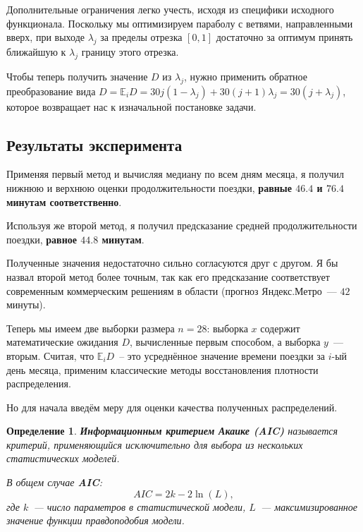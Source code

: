 \documentclass[12pt, fleqn, titlepage]{article}
\newtheorem{Def}{Определение}
\begin{document}
    Дополнительные ограничения легко учесть, исходя из специфики исходного функционала. 
    Поскольку мы оптимизируем параболу с ветвями, направленными вверх, при выходе $\lambda_j$ за пределы отрезка 
    $[0, 1]$ достаточно за оптимум принять ближайшую к $\lambda_j$ границу этого отрезка.
    
    Чтобы теперь получить значение $D$ из $\lambda_j$, нужно применить обратное преобразование 
    вида $D = \mathbb{E}_i D = 30j(1 - \lambda_j)+ 30(j + 1)\lambda_j = 30(j + \lambda_j)$, которое возвращает нас к изначальной постановке задачи.

    \subsection{Результаты эксперимента}

    Применяя первый метод и вычисляя медиану по всем дням месяца, я получил нижнюю и верхнюю оценки 
    продолжительности поездки, {\bf равные $46.4$ и $76.4$ минутам соответственно}.

    Используя же второй метод, я получил предсказание средней продолжительности поездки, {\bf равное $44.8$ минутам}.
    
    Полученные значения недостаточно сильно согласуются друг с другом. Я бы назвал второй метод более 
    точным, так как его предсказание соответствует современным коммерческим решениям в области (прогноз Яндекс.Метро~--- $42$ минуты).
    
    Теперь мы имеем две выборки размера $n=28$: выборка $x$ содержит математические ожидания $D$, вычисленные первым способом, а выборка 
    $y$~--- вторым. Считая, что $\mathbb{E}_i D$~-- это усреднённое значение времени поездки за $i$-ый день месяца, применим классические 
    методы восстановления плотности распределения. 

    Но для начала введём меру для оценки качества полученных распределений.

    \begin{Def}{}
        \textbf{Информационным критерием Акаике (AIC)} называется 
        критерий, применяющийся исключительно для выбора из нескольких статистических моделей.

        В общем случае \textbf{AIC}:
        $${\mathit {AIC}}=2k-2\ln(L),$$
        где $k$~--- число параметров в статистической модели, 
        $L$~--- максимизированное значение функции правдоподобия модели.
    \end{Def}
\end{document}
